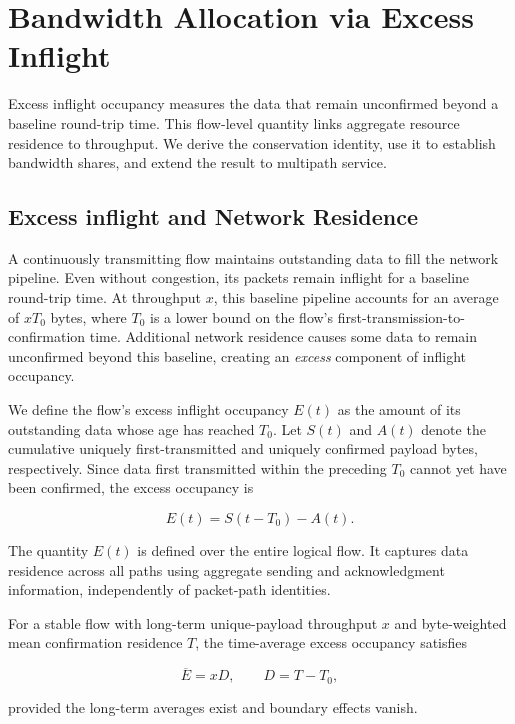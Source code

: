 \section{Bandwidth Allocation via Excess Inflight}
\label{sec:signal}

Excess inflight occupancy measures the data that remain unconfirmed beyond a baseline round-trip time. This flow-level quantity links aggregate resource residence to throughput. We derive the conservation identity, use it to establish bandwidth shares, and extend the result to multipath service.

\subsection{Excess inflight and Network Residence}
\label{sec:residence}

A continuously transmitting flow maintains outstanding data to fill the network pipeline. Even without congestion, its packets remain inflight for a baseline round-trip time. At throughput \(x\), this baseline pipeline accounts for an average of \(xT_0\) bytes, where \(T_0\) is a lower bound on the flow's first-transmission-to-confirmation time. Additional network residence causes some data to remain unconfirmed beyond this baseline, creating an \emph{excess} component of inflight occupancy.

We define the flow's excess inflight occupancy \(E(t)\) as the amount of its outstanding data whose age has reached \(T_0\). Let \(S(t)\) and \(A(t)\) denote the cumulative uniquely first-transmitted and uniquely confirmed payload bytes, respectively. Since data first transmitted within the preceding \(T_0\) cannot yet have been confirmed, the excess occupancy is

\begin{equation}
\label{eq:signal-1}
\boxed{
E(t)=S(t-T_0)-A(t).
}
\end{equation}

The quantity \(E(t)\) is defined over the entire logical flow. It captures data residence across all paths using aggregate sending and acknowledgment information, independently of packet-path identities.

\begin{lemma}
\label{lem:main-1}
For a stable flow with long-term unique-payload throughput \(x\) and byte-weighted mean confirmation residence \(T\), the time-average excess occupancy satisfies

\begin{equation}
\label{eq:signal-2}
\boxed{
\overline E=xD,
\qquad D=T-T_0,
}
\end{equation}

provided the long-term averages exist and boundary effects vanish.
\end{lemma}

